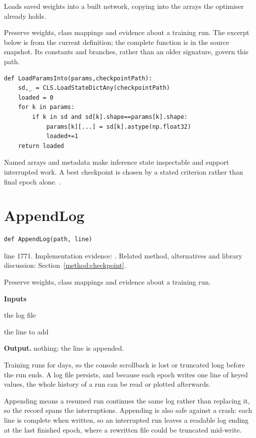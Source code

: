 Loads saved weights into a built network, copying into the arrays the optimiser already holds.


Preserve weights, class mappings and evidence about a training run. The excerpt below is from the current definition; the complete function is in the source snapshot. Its constants and branches, rather than an older signature, govern this path.


\begin{lstlisting}[style=plain]
def LoadParamsInto(params,checkpointPath):
    sd,_ = CLS.LoadStateDictAny(checkpointPath)
    loaded = 0
    for k in params:
        if k in sd and sd[k].shape==params[k].shape:
            params[k][...] = sd[k].astype(np.float32)
            loaded+=1
    return loaded
\end{lstlisting}
Named arrays and metadata make inference state inspectable and support interrupted work. A best checkpoint is chosen by a stated criterion rather than final epoch alone. \cite{code2026,numpysavez}.


\section{AppendLog}\label{fn:train:AppendLog}
\begin{lstlisting}[style=sig]
def AppendLog(path, line)
\end{lstlisting}
 line 1771. Implementation evidence: \cite{code2026}. Related method, alternatives and library discussion: Section~\ref{method:checkpoint}.


Preserve weights, class mappings and evidence about a training run.




\noindent\textbf{Inputs}
\begin{description}[leftmargin=2.2em,style=nextline,font=\normalfont\ttfamily]\setlength\itemsep{1pt}
  \item[{path}] \normalfont the log file
  \item[{line}] \normalfont the line to add
\end{description}

\noindent\textbf{Output.} nothing; the line is appended.


Training runs for days, so the console scrollback is lost or truncated long before the run ends. A log file persists, and because each epoch writes one line of keyed values, the whole history of a run can be read or plotted afterwards.


Appending means a resumed run continues the same log rather than replacing it, so the record spans the interruptions. Appending is also safe against a crash: each line is complete when written, so an interrupted run leaves a readable log ending at the last finished epoch, where a rewritten file could be truncated mid-write.


